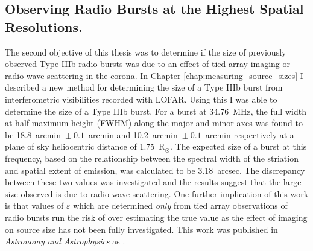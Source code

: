 \subsection{Observing Radio Bursts at the Highest Spatial Resolutions.}
The second objective of this thesis was to determine if the size of previously observed Type IIIb radio bursts was due to an effect of tied array imaging or radio wave scattering in the corona. In Chapter \ref{chap:measuring_source_sizes} I described a new method for determining the size of a Type IIIb burst from interferometric visibilities recorded with LOFAR. Using this I was able to determine the size of a Type IIIb burst. For a burst at 34.76~MHz, the full width at half maximum height (FWHM) along the major and minor axes was found to be 18.8~arcmin~$\pm~0.1$~arcmin and 10.2~arcmin~$\pm~0.1$~arcmin respectively at a plane of sky heliocentric distance of 1.75~R$_\odot$. The expected size of a burst at this frequency, based on the relationship between the spectral width of the striation and spatial extent of emission, was calculated to be 3.18~arcsec. The discrepancy between these two values was investigated and the results suggest that the large size observed is due to radio wave scattering. One further implication of this work is that values of $\varepsilon$ which are determined \textit{only} from tied array observations of radio bursts run the risk of over estimating the true value as the effect of imaging on source size has not been fully investigated. This work was published in \textit{Astronomy and Astrophysics} as \cite{Murphy2021}.

